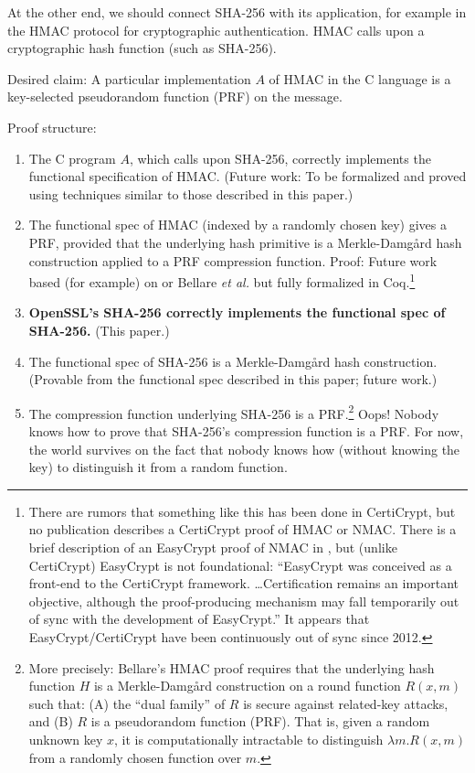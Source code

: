 \documentclass[prodmode,acmtoplas]{acmsmall}
\begin{document}
At the other end, we should connect SHA-256 with its application,
for example in the HMAC protocol for cryptographic authentication.
HMAC calls upon a cryptographic hash function (such as SHA-256).

Desired claim:  A particular implementation $A$ of HMAC in the C language
is a key-selected pseudorandom function (PRF) on the message.

Proof structure:
\begin{enumerate}
\item The C program $A$, which calls upon SHA-256,
correctly implements the functional specification of HMAC.
(Future work: To be formalized and proved using techniques similar to 
those described in this paper.)
\item The functional spec of HMAC (indexed by a randomly chosen key)
gives a PRF, provided that
the underlying hash primitive is a Merkle-Damg\r{a}rd hash construction
applied to a PRF compression function.  Proof: 
Future work based
(for example) on 
or
Bellare \emph{et al.} 
\citeyear{bellare1996keying,bellare2006new}
but fully formalized in Coq.\footnote{%
There are rumors that something like this has been done in
CertiCrypt, but no publication describes a CertiCrypt
proof of HMAC or NMAC.  There is a brief description of
an EasyCrypt proof of NMAC in \cite{barthe2012:itp},
but (unlike CertiCrypt) EasyCrypt is not foundational:
``EasyCrypt was conceived as a front-end
to the CertiCrypt framework. \ldots Certification remains
an important objective, although the proof-producing mechanism
may fall temporarily out of sync with the development of EasyCrypt.''
\cite{barthe2012:itp}  It appears that EasyCrypt/CertiCrypt have been
continuously out of sync since 2012.}
\item \textbf{OpenSSL's SHA-256 correctly implements the functional
spec of SHA-256.}  (This paper.)
\item The functional spec of SHA-256 is a 
Merkle-Damg\r{a}rd hash construction.
(Provable from the functional spec described in this paper; future work.)
\item The compression function underlying SHA-256 is a PRF.\footnote{
More precisely:
Bellare's \citeyear{bellare2006new} HMAC proof 
requires that the underlying hash function $H$
is a Merkle-Damg\r{a}rd construction on a round function
$R(x,m)$ such that:  (A) the ``dual family'' of $R$ is secure against
related-key attacks, and (B) $R$ is a pseudorandom function (PRF).
That is, given a random unknown key $x$, it is computationally 
intractable to distinguish $\lambda m.R(x,m)$ from a randomly chosen
function over $m$.}
Oops!  Nobody knows how to prove that 
SHA-256's compression function is a PRF.  For now, the world survives
on the fact that nobody knows how (without knowing the key)
to distinguish it from a random function.
\end{enumerate}
\end{document}
